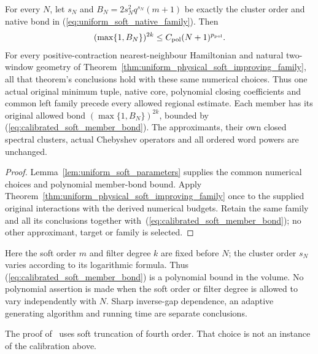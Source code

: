 \begin{corollary}
    For every $N$, let $s_N$ and $B_N=2s_N^2q^{s_N}(m+1)$ be exactly
    the cluster order and native bond in
    (\ref{eq:uniform_soft_native_family}). Then
    \begin{align}
        (\max\{1,B_N\})^{2k}
        \le C_{\rm pol}(N+1)^{p_{\rm pol}}.
        \label{eq:calibrated_soft_member_bond}
    \end{align}
    For every positive-contraction nearest-neighbour Hamiltonian and
    natural two-window geometry of
    Theorem~\ref{thm:uniform_physical_soft_improving_family}, all that
    theorem's conclusions hold with these same numerical choices.
    Thus one actual original minimum tuple, native core, polynomial
    closing coefficients and common left family precede every allowed
    regional estimate. Each member has its original allowed bond
    $(\max\{1,B_N\})^{2k}$, bounded by
    (\ref{eq:calibrated_soft_member_bond}). The approximants, their own
    closed spectral clusters, actual Chebyshev operators and all ordered
    word powers are unchanged.
\end{corollary}
\begin{proof}\leanok
    Lemma~\ref{lem:uniform_soft_parameters} supplies the common numerical
    choices and polynomial member-bond bound.
    Apply Theorem~\ref{thm:uniform_physical_soft_improving_family}
    once to the supplied original interactions with the derived
    numerical budgets. Retain the same family and all its conclusions together
    with~(\ref{eq:calibrated_soft_member_bond}); no other approximant,
    target or family is selected.
\end{proof}

Here the soft order $m$ and filter degree $k$ are fixed before $N$;
the cluster order $s_N$ varies according to its logarithmic formula. Thus
(\ref{eq:calibrated_soft_member_bond}) is a polynomial bound in the
volume. No polynomial assertion is made when the soft order or filter degree
is allowed to vary independently with $N$. Sharp inverse-gap dependence,
an adaptive generating algorithm and running time are separate conclusions.

The proof of~\cite[lines 1373--1420]{Arad2016RigorousRG} uses soft truncation
of fourth order. That choice is not an instance of the calibration above.

